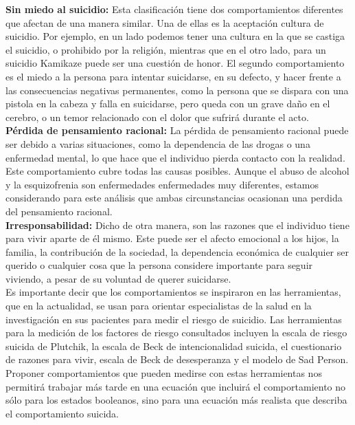 {{{{{\textbf{Sin miedo al suicidio:} Esta clasificación tiene dos comportamientos diferentes que afectan de una manera similar. Una de ellas es la aceptación cultura de suicidio. Por ejemplo, en un lado podemos tener una cultura en la que se castiga el suicidio, o prohibido por la religión, mientras que en el otro lado, para un suicidio Kamikaze puede ser una cuestión de honor. El segundo comportamiento es el miedo a la persona para intentar suicidarse, en su defecto, y hacer frente a las consecuencias negativas permanentes, como la persona que se dispara con una pistola en la cabeza y falla en suicidarse, pero queda con un grave daño en el cerebro, o un temor relacionado con el dolor que sufrirá durante el acto. \\

\textbf{Pérdida de pensamiento racional:} La pérdida de pensamiento racional puede ser debido a varias situaciones, como la dependencia de las drogas o una enfermedad mental, lo que hace que el individuo pierda contacto con la realidad. Este comportamiento cubre todas las causas posibles. Aunque el abuso de alcohol y la esquizofrenia son enfermedades enfermedades muy diferentes, estamos considerando para este análisis que ambas circunstancias ocasionan una perdida del pensamiento racional. \\

\textbf{Irresponsabilidad:} Dicho de otra manera, son las razones que el individuo tiene para vivir aparte de él mismo. Este puede ser el afecto emocional a los hijos, la familia, la contribución de la sociedad, la dependencia económica de cualquier ser querido o cualquier cosa que la persona considere importante para seguir viviendo, a pesar de su voluntad de querer suicidarse. \\

Es importante decir que los comportamientos se inspiraron en las herramientas, que en la actualidad, se usan para orientar especialistas de la salud en la investigación en sus pacientes para medir el riesgo de suicidio. Las herramientas para la medición de los factores de riesgo consultados incluyen la escala de riesgo suicida de Plutchik, la escala de Beck de intencionalidad suicida, el cuestionario de razones para vivir, escala de Beck de desesperanza y el modelo de Sad Person. Proponer comportamientos que pueden medirse con estas herramientas nos permitirá trabajar más tarde en una ecuación que incluirá el comportamiento no sólo para los estados booleanos, sino para una ecuación más realista que describa el comportamiento suicida. \\

}}}}}
